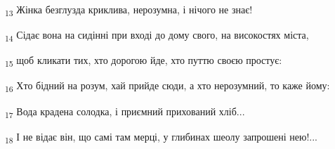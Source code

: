 \begin{tcolorbox}
\textsubscript{13} Жінка безглузда криклива, нерозумна, і нічого не знає!
\end{tcolorbox}
\begin{tcolorbox}
\textsubscript{14} Сідає вона на сидінні при вході до дому свого, на високостях міста,
\end{tcolorbox}
\begin{tcolorbox}
\textsubscript{15} щоб кликати тих, хто дорогою йде, хто путтю своєю простує:
\end{tcolorbox}
\begin{tcolorbox}
\textsubscript{16} Хто бідний на розум, хай прийде сюди, а хто нерозумний, то каже йому:
\end{tcolorbox}
\begin{tcolorbox}
\textsubscript{17} Вода крадена солодка, і приємний прихований хліб...
\end{tcolorbox}
\begin{tcolorbox}
\textsubscript{18} І не відає він, що самі там мерці, у глибинах шеолу запрошені нею!...
\end{tcolorbox}

